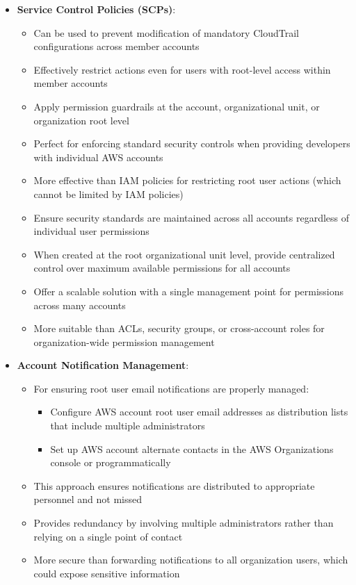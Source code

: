 \documentclass[11pt,a4paper]{report}
\begin{document}
\begin{itemize}
  \item \textbf{Service Control Policies (SCPs)}:
\begin{itemize}
  \item Can be used to prevent modification of mandatory CloudTrail configurations across member accounts
  \item Effectively restrict actions even for users with root-level access within member accounts
  \item Apply permission guardrails at the account, organizational unit, or organization root level
  \item Perfect for enforcing standard security controls when providing developers with individual AWS accounts
  \item More effective than IAM policies for restricting root user actions (which cannot be limited by IAM policies)
  \item Ensure security standards are maintained across all accounts regardless of individual user permissions
  \item When created at the root organizational unit level, provide centralized control over maximum available permissions for all accounts
  \item Offer a scalable solution with a single management point for permissions across many accounts
  \item More suitable than ACLs, security groups, or cross-account roles for organization-wide permission management
\end{itemize}
  \item \textbf{Account Notification Management}:
\begin{itemize}
  \item For ensuring root user email notifications are properly managed:
\begin{itemize}
  \item Configure AWS account root user email addresses as distribution lists that include multiple administrators
  \item Set up AWS account alternate contacts in the AWS Organizations console or programmatically
\end{itemize}
  \item This approach ensures notifications are distributed to appropriate personnel and not missed
  \item Provides redundancy by involving multiple administrators rather than relying on a single point of contact
  \item More secure than forwarding notifications to all organization users, which could expose sensitive information

\end{itemize}
\end{itemize}
\end{document}
